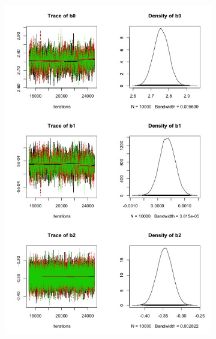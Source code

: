 \documentclass[12pt, a4paper]{article}
\begin{document}
\begin{figure}[H]
\centering
\begin{subfigure}{.5\textwidth}
\centering
\includegraphics[width=1\linewidth]{Afig1.jpeg}
\end{subfigure}%
\begin{subfigure}{.5\textwidth}
\centering

\end{subfigure}
\end{figure}
\end{document}
